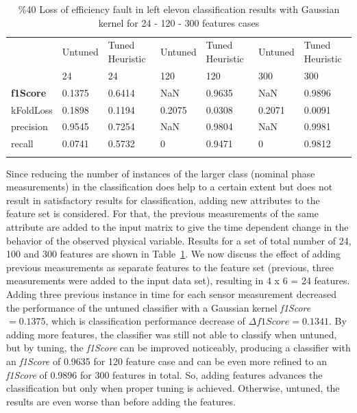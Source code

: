 \begin{table}
	\centering
\caption{\%40 Loss of efficiency fault in left elevon classification results with Gaussian kernel for 24 - 120 - 300 features cases}
\label{tab:loe40_featureAddition}       %
\begin{tabular}{l m{1.6cm} m{1.6 cm} m{1.6 cm} m{1.6 cm} m{1.6 cm} m{1.6 cm}}
\hline\noalign{\smallskip}
 & Untuned & Tuned Heuristic  & Untuned & Tuned Heuristic  & Untuned & Tuned Heuristic \\
 & 24 & 24 & 120 & 120 &  300 &  300 \\
\noalign{\smallskip}\hline\noalign{\smallskip}
\textbf{f1Score} & 0.1375 & 0.6414 & NaN & 0.9635 & NaN & 0.9896\\
kFoldLoss & 0.1898 & 0.1194 &  0.2075 & 0.0308 & 0.2071 & 0.0091\\
precision & 0.9545 & 0.7254 & NaN & 0.9804 & NaN & 0.9981\\
recall & 0.0741 & 0.5732 & 0 & 0.9471 & 0 & 0.9812 \\
\noalign{\smallskip}\hline
\end{tabular}
\end{table}


Since reducing the number of instances of the larger class (nominal phase measurements) in the classification does help to a certain extent but does not result in satisfactory results for classification, adding new attributes to the feature set is considered. 
For that, the previous measurements of the same attribute are added to the input matrix to give the time dependent change in the behavior of the observed physical variable. Results for a set of total number of 24, 100 and 300 features are shown in Table~\ref{tab:loe40_featureAddition}. 
We now discuss the effect of adding previous measurements as separate features to the feature set (previous, three measurements were added to the input data set), resulting in 4 x 6 = 24 features. 
Adding three previous instance in time for each sensor measurement decreased the performance of the untuned classifier with a Gaussian kernel \emph{f1Score} $= 0.1375$, which is classification performance decrease of $\Delta f1Score = 0.1341$. 
By adding more features, the classifier was still not able to classify when untuned, but by tuning, the \emph{f1Score} can be improved noticeably, producing a classifier with an \emph{f1Score} of 0.9635 for 120 feature case and can be even more refined to an \emph{f1Score} of 0.9896 for 300 features in total. 
So, adding features advances the classification but only when proper tuning is achieved. Otherwise, untuned, the results are even worse than before adding the features.


